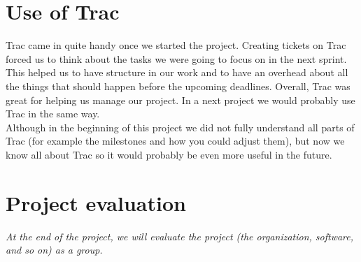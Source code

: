\section{Use of Trac}
Trac came in quite handy once we started the project. Creating tickets on Trac forced us to think about the tasks we were going to focus on in the next sprint. This helped us to have structure in our work and to have an overhead about all the things that should happen before the upcoming deadlines. Overall, Trac was great for helping us manage our project. In a next project we would probably use Trac in the same way.\\
Although in the beginning of this project we did not fully understand all parts of Trac (for example the milestones and how you could adjust them), but now we know all about Trac so it would probably be even more useful in the future.



\section{Project evaluation}
\textit{At the end of the project, we will evaluate the project (the organization, software, and so on) as a group.}

